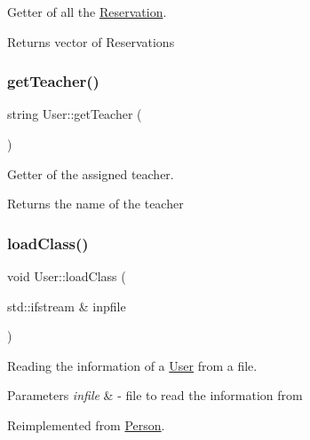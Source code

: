 Getter of all the \mbox{\hyperlink{class_reservation}{Reservation}}. 

\begin{DoxyReturn}{Returns}
vector of Reservations 
\end{DoxyReturn}
\mbox{\label{class_user_ac9fcbd4f944689de5faf746aa277d81a}} 
\subsubsection{\texorpdfstring{get\+Teacher()}{getTeacher()}}
{\footnotesize\ttfamily string User\+::get\+Teacher (\begin{DoxyParamCaption}{ }\end{DoxyParamCaption})}



Getter of the assigned teacher. 

\begin{DoxyReturn}{Returns}
the name of the teacher 
\end{DoxyReturn}
\mbox{\label{class_user_abc12a9ca668bd860a3d6d2ae4791997d}} 
\subsubsection{\texorpdfstring{load\+Class()}{loadClass()}}
{\footnotesize\ttfamily void User\+::load\+Class (\begin{DoxyParamCaption}\item[{std\+::ifstream \&}]{inpfile }\end{DoxyParamCaption})\hspace{0.3cm}{\ttfamily [virtual]}}



Reading the information of a \mbox{\hyperlink{class_user}{User}} from a file. 


\begin{DoxyParams}{Parameters}
{\em infile} & -\/ file to read the information from \\
\hline
\end{DoxyParams}


Reimplemented from \mbox{\hyperlink{class_person_af07a032df8d56dddade4dc43960b536b}{Person}}.

\mbox{\label{class_user_a1ddb4cbabc84ef92ac92bfe6f9385d39}} 
